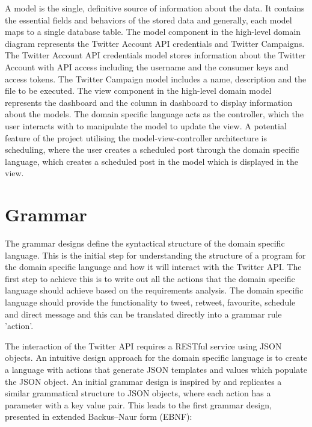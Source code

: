 A model is the single, definitive source of information about the data. It contains the essential fields and behaviors of the stored data and generally, each model maps to a single database table. The model component in the high-level domain diagram represents the Twitter Account API credentials and Twitter Campaigns. The Twitter Account API credentials model stores information about the Twitter Account with API access including the username and the consumer keys and access tokens. The Twitter Campaign model includes a name, description and the file to be executed. The view component in the high-level domain model represents the dashboard and the column in dashboard to display information about the models. The domain specific language acts as the controller, which the user interacts with to manipulate the model to update the view. A potential feature of the project utilising the model-view-controller architecture is scheduling, where the user creates a scheduled post through the domain specific language, which creates a scheduled post in the model which is displayed in the view.

\section{Grammar}

The grammar designs define the syntactical structure of the domain specific language. This is the initial step for understanding the structure of a program for the domain specific language and how it will interact with the Twitter API. The first step to achieve this is to write out all the actions that the domain specific language should achieve based on the requirements analysis. The domain specific language should provide the functionality to tweet, retweet, favourite, schedule and direct message and this can be translated directly into a grammar rule 'action'. \newline \par

The interaction of the Twitter API requires a RESTful service using JSON objects. An intuitive design approach for the domain specific language is to create a language with actions that generate JSON templates and values which populate the JSON object. An initial grammar design is inspired by and replicates a similar grammatical structure to JSON objects, where each action has a parameter with a key value pair. This leads to the first grammar design, presented in extended Backus–Naur form (EBNF):

